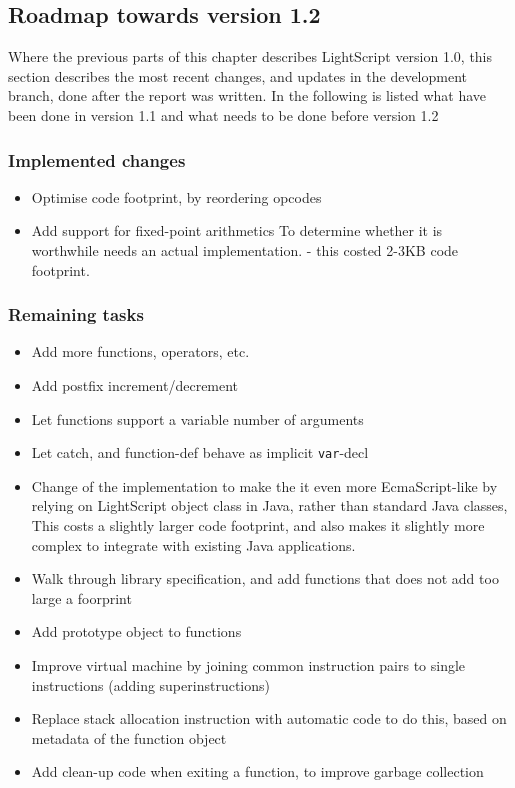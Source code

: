 \documentclass[11pt]{report}
\begin{document}
\subsection{Roadmap towards version 1.2}
Where the previous parts of this chapter describes LightScript version 1.0, this section describes the most recent changes, and updates in the development branch, done after the report was written.
In the following is listed what have been done in version 1.1 and what needs to be done before version 1.2
\subsubsection{Implemented changes}
\begin{itemize}
\item Optimise code footprint, by reordering opcodes
\item Add support for fixed-point arithmetics
To determine whether it is worthwhile needs an actual implementation. - this costed 2-3KB code footprint.
\end{itemize}
\subsubsection{Remaining tasks}
\begin{itemize}
\item Add more functions, operators, etc. 
\item Add postfix increment/decrement
\item Let functions support a variable number of arguments
\item Let catch, and function-def behave as implicit \verb|var|-decl
\item Change of the implementation to make the it even more EcmaScript-like by relying on LightScript object class in Java, rather than standard Java classes, This costs a slightly larger code footprint, and also makes it slightly more complex to integrate with existing Java applications.
\item Walk through library specification, and add functions that does not add too large a foorprint
\item Add prototype object to functions
\item Improve virtual machine by joining common instruction pairs to single instructions (adding superinstructions)
\item Replace stack allocation instruction with automatic code to do this, based on metadata of the function object 
\item Add clean-up code when exiting a function, to improve garbage collection
\end{itemize}
\end{document}
